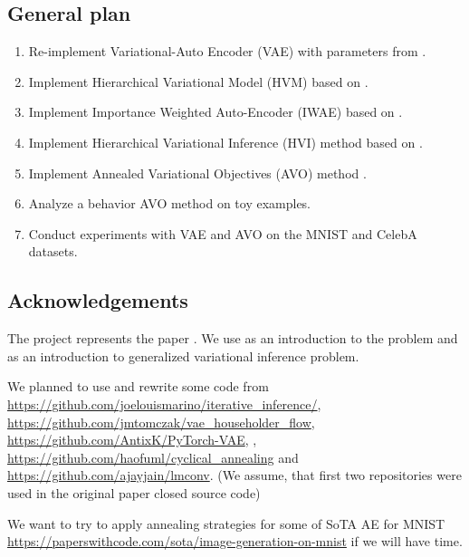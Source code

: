 \documentclass[a4paper]{article}
\begin{document}
\subsection*{General plan}
\begin{enumerate}
    \item Re-implement Variational-Auto Encoder (VAE) \cite{kingma2013autoencoding} with parameters from \cite{TW:2016}. %
    \item Implement Hierarchical Variational Model (HVM) based on \cite{ranganath2015hierarchical}.
    \item Implement Importance Weighted Auto-Encoder (IWAE) based on \cite{burda2015importance}.
    \item Implement Hierarchical Variational Inference (HVI) method  based on \cite{ranganath2015hierarchical}.
    \item Implement Annealed Variational Objectives (AVO) method \cite{main_Huang2018ImprovingEI}.
    \item Analyze a behavior AVO method on toy examples.
    \item Conduct experiments with VAE and AVO on the MNIST and CelebA datasets.
\end{enumerate}

\subsection*{Acknowledgements}

The project represents the paper \cite{main_Huang2018ImprovingEI}.
We use \cite{lucas2019understanding} as an introduction to the problem and \cite{Knoblauch2019GeneralizedVI} as an introduction to generalized variational inference problem. 

We planned to use and rewrite some code from \url{https://github.com/joelouismarino/iterative_inference/}, \url{https://github.com/jmtomczak/vae_householder_flow}, \url{https://github.com/AntixK/PyTorch-VAE}, , \url{https://github.com/haofuml/cyclical_annealing} and \url{https://github.com/ajayjain/lmconv}. (We assume, that first two repositories were used in the original paper \cite{main_Huang2018ImprovingEI} closed source code) 

We want to try to apply annealing strategies for some of SoTA AE for MNIST \url{https://paperswithcode.com/sota/image-generation-on-mnist} if we will have time.



\end{document}
